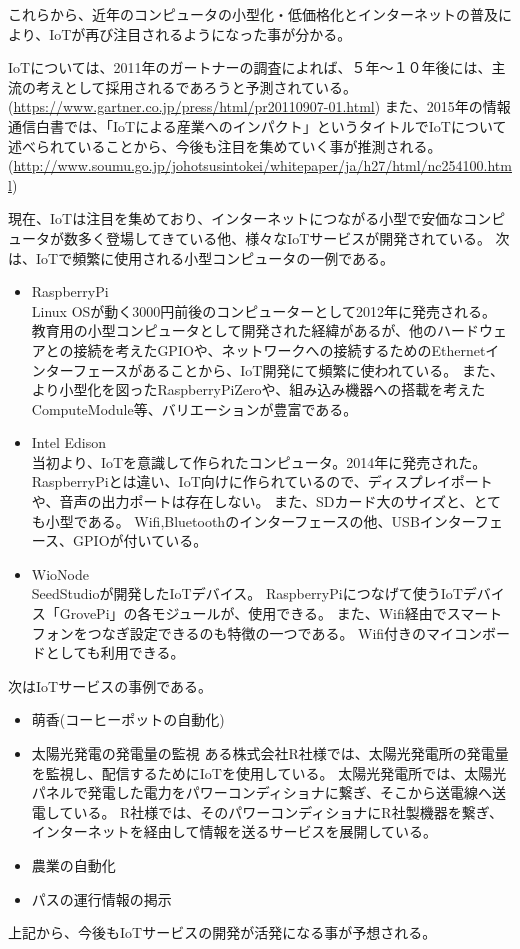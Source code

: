 これらから、近年のコンピュータの小型化・低価格化とインターネットの普及により、IoTが再び注目されるようになった事が分かる。


IoTについては、2011年のガートナーの調査によれば、５年〜１０年後には、主流の考えとして採用されるであろうと予測されている。
(\url{https://www.gartner.co.jp/press/html/pr20110907-01.html})
また、2015年の情報通信白書では、「IoTによる産業へのインパクト」というタイトルでIoTについて述べられていることから、今後も注目を集めていく事が推測される。
(\url{http://www.soumu.go.jp/johotsusintokei/whitepaper/ja/h27/html/nc254100.html})

現在、IoTは注目を集めており、インターネットにつながる小型で安価なコンピュータが数多く登場してきている他、様々なIoTサービスが開発されている。
次は、IoTで頻繁に使用される小型コンピュータの一例である。
\begin{itemize}
\item RaspberryPi\\
	Linux OSが動く3000円前後のコンピューターとして2012年に発売される。
	教育用の小型コンピュータとして開発された経緯があるが、他のハードウェアとの接続を考えたGPIOや、ネットワークへの接続するためのEthernetインターフェースがあることから、IoT開発にて頻繁に使われている。
	また、より小型化を図ったRaspberryPiZeroや、組み込み機器への搭載を考えたComputeModule等、バリエーションが豊富である。
\item Intel Edison\\
	当初より、IoTを意識して作られたコンピュータ。2014年に発売された。
	RaspberryPiとは違い、IoT向けに作られているので、ディスプレイポートや、音声の出力ポートは存在しない。
	また、SDカード大のサイズと、とても小型である。
	Wifi,Bluetoothのインターフェースの他、USBインターフェース、GPIOが付いている。
\item WioNode\\
	SeedStudioが開発したIoTデバイス。
	RaspberryPiにつなげて使うIoTデバイス「GrovePi」の各モジュールが、使用できる。
	また、Wifi経由でスマートフォンをつなぎ設定できるのも特徴の一つである。
	Wifi付きのマイコンボードとしても利用できる。
\end{itemize}

次はIoTサービスの事例である。
\begin{itemize}
\item 萌香(コーヒーポットの自動化)
\item 太陽光発電の発電量の監視
	ある株式会社R社様では、太陽光発電所の発電量を監視し、配信するためにIoTを使用している。
	太陽光発電所では、太陽光パネルで発電した電力をパワーコンディショナに繋ぎ、そこから送電線へ送電している。
	R社様では、そのパワーコンディショナにR社製機器を繋ぎ、インターネットを経由して情報を送るサービスを展開している。
\item 農業の自動化
	
\item パスの運行情報の掲示

\end{itemize}
上記から、今後もIoTサービスの開発が活発になる事が予想される。

